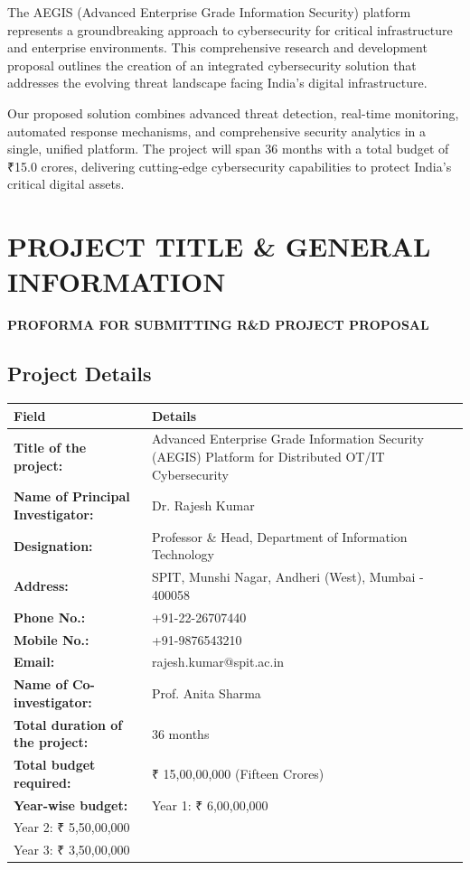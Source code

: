 \documentclass[12pt,a4paper]{article}
\begin{document}
The AEGIS (Advanced Enterprise Grade Information Security) platform represents a groundbreaking approach to cybersecurity for critical infrastructure and enterprise environments. This comprehensive research and development proposal outlines the creation of an integrated cybersecurity solution that addresses the evolving threat landscape facing India's digital infrastructure.

Our proposed solution combines advanced threat detection, real-time monitoring, automated response mechanisms, and comprehensive security analytics in a single, unified platform. The project will span 36 months with a total budget of ₹15.0 crores, delivering cutting-edge cybersecurity capabilities to protect India's critical digital assets.

\newpage

\section{PROJECT TITLE \& GENERAL INFORMATION}

\begin{center}
\textbf{\large PROFORMA FOR SUBMITTING R\&D PROJECT PROPOSAL}
\end{center}

\subsection{Project Details}

\begin{longtable}{|p{6cm}|p{8cm}|}
\hline
\rowcolor{lightblue}
\textbf{Field} & \textbf{Details} \\
\hline
\textbf{Title of the project:} & Advanced Enterprise Grade Information Security (AEGIS) Platform for Distributed OT/IT Cybersecurity \\
\hline
\textbf{Name of Principal Investigator:} & Dr. Rajesh Kumar \\
\hline
\textbf{Designation:} & Professor \& Head, Department of Information Technology \\
\hline
\textbf{Address:} & SPIT, Munshi Nagar, Andheri (West), Mumbai - 400058 \\
\hline
\textbf{Phone No.:} & +91-22-26707440 \\
\hline
\textbf{Mobile No.:} & +91-9876543210 \\
\hline
\textbf{Email:} & rajesh.kumar@spit.ac.in \\
\hline
\textbf{Name of Co-investigator:} & Prof. Anita Sharma \\
\hline
\textbf{Total duration of the project:} & 36 months \\
\hline
\textbf{Total budget required:} & ₹ 15,00,00,000 (Fifteen Crores) \\
\hline
\textbf{Year-wise budget:} & 
Year 1: ₹ 6,00,00,000 \\
Year 2: ₹ 5,50,00,000 \\
Year 3: ₹ 3,50,00,000 \\
\hline
\end{longtable}
\end{document}

